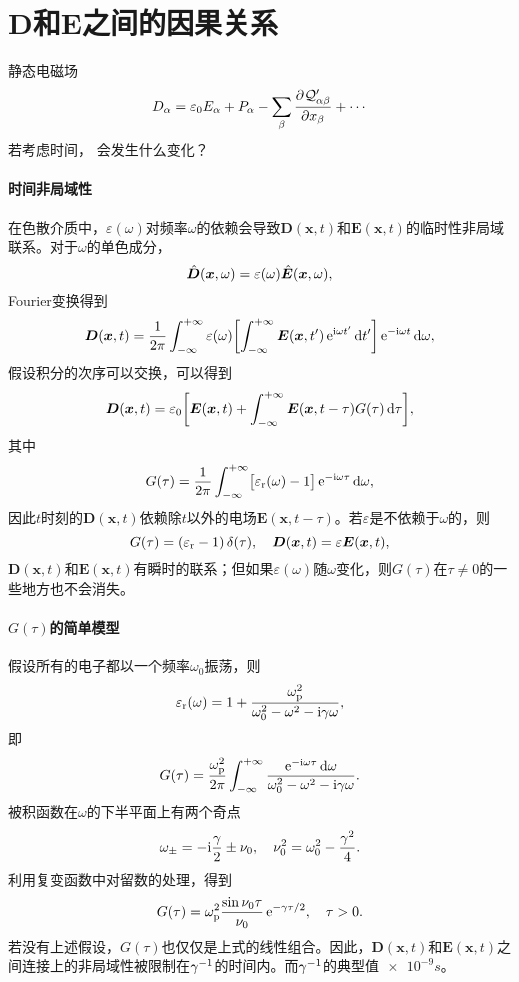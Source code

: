 \section{\texorpdfstring{$\bm D$}{D}和\texorpdfstring{$\bm E$}{E}之间的因果关系}

静态电磁场
\[
    D_\alpha=\varepsilon_0E_\alpha+P_\alpha-\sum_\beta\frac{\partial^{{}}\mathcal Q'_{\alpha\beta}}{\partial{x_\beta}^{{}}}+\cdots
\]
若考虑时间，
会发生什么变化？
\paragraph{时间非局域性}
在色散介质中，$\varepsilon(\omega)$对频率$\omega$的依赖会导致$\bm D(\bm x,t)$和$\bm E(\bm x,t)$的临时性非局域联系。对于$\omega$的单色成分，
\[
    \hat{\bm{D}}(\bm x,\omega)=\varepsilon(\omega)\hat{\bm{E}}(\bm x,\omega),
\]
Fourier变换得到
\[
    \bm D(\bm x,t)=\frac1{2\pi}\int_{-\infty}^{+\infty}\varepsilon(\omega)\biggl[\int_{-\infty}^{+\infty}\bm E(\bm x,t')\mathop{}\!\mathrm{e}^{\mathrm{i}\omega t'}\mathop{}\!\mathrm{d} t'\biggr]\mathop{}\!\mathrm{e}^{-\mathrm{i}\omega t}\mathop{}\!\mathrm{d}\omega,
\]
假设积分的次序可以交换，可以得到
\begin{equation}
    \label{eqn:D-E with omega}
    \bm D(\bm x,t)=\varepsilon_0\biggl[\bm E(\bm x,t)+\int_{-\infty}^{+\infty}\bm E(\bm x,t-\tau)G(\tau)\mathop{}\!\mathrm{d}\tau\biggr],
\end{equation}
其中 
\[
    G(\tau)=\frac1{2\pi}\int_{-\infty}^{+\infty}\bigl[\varepsilon_\text r(\omega)-1\bigr]\mathop{}\!\mathrm{e}^{-\mathrm{i}\omega\tau}\mathop{}\!\mathrm{d}\omega,
\]
因此$t$时刻的$\bm D(\bm x,t)$依赖除$t$以外的电场$\bm E(\bm x,t-\tau)$。若$\varepsilon$是不依赖于$\omega$的，则 
\[
    G(\tau)=(\varepsilon_\text r-1)\mathop{}\!\delta(\tau),\quad\bm D(\bm x,t)=\varepsilon\bm E(\bm x,t),
\]
$\bm D(\bm x,t)$和$\bm E(\bm x,t)$有瞬时的联系；但如果$\varepsilon(\omega)$随$\omega$变化，则$G(\tau)$在$\tau\neq 0$的一些地方也不会消失。
\paragraph{$G(\tau)$的简单模型}
假设所有的电子都以一个频率$\omega_0$振荡，则 
\[
    \varepsilon_\text r(\omega)=1+\frac{\omega_\text p^2}{\omega_0^2-\omega^2-\mathrm{i}\gamma\omega},
\]
即 
\[
    G(\tau)=\frac{\omega_\text p^2}{2\pi}\int_{-\infty}^{+\infty}\frac{\mathop{}\!\mathrm{e}^{-\mathrm{i}\omega\tau}\mathop{}\!\mathrm{d}\omega}{\omega_0^2-\omega^2-\mathrm{i}\gamma\omega}.
\]
被积函数在$\omega$的下半平面上有两个奇点
\[
    \omega_\pm=-\mathrm{i}\frac\gamma 2\pm\nu_0,\quad\nu_0^2=\omega_0^2-\frac{\gamma^2}4.
\]
利用复变函数中对留数的处理，得到
\[
    G(\tau)=\omega_\text p^2\frac{\sin\nu_0\tau}{\nu_0}\mathop{}\!\mathrm{e}^{-\gamma\tau/2},\quad\tau>0.
\]
若没有上述假设，$G(\tau)$也仅仅是上式的线性组合。因此，$\bm D(\bm x,t)$和$\bm E(\bm x,t)$之间连接上的非局域性被限制在$\gamma^{-1}$的时间内。而$\gamma^{-1}$的典型值$\SI{e-9}s$。

